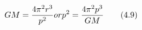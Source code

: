 \begin{equation*}
GM = \frac{4\pi^{2}r^{3}}{p^{2}} or \newline
p^{2} = \frac{4\pi^{2}p^{3}}{GM} \tag{4.9}
\end{equation*}
